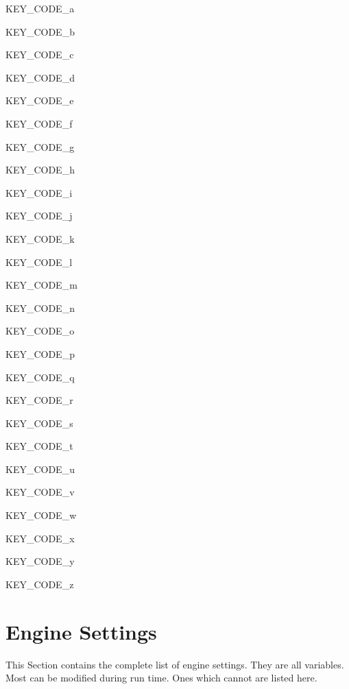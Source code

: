 KEY\_\-CODE\_\-a \par
 KEY\_\-CODE\_\-b \par
 KEY\_\-CODE\_\-c \par
 KEY\_\-CODE\_\-d \par
 KEY\_\-CODE\_\-e \par
 KEY\_\-CODE\_\-f \par
 KEY\_\-CODE\_\-g \par
 KEY\_\-CODE\_\-h \par
 KEY\_\-CODE\_\-i \par
 KEY\_\-CODE\_\-j \par
 KEY\_\-CODE\_\-k \par
 KEY\_\-CODE\_\-l \par
 KEY\_\-CODE\_\-m \par
 KEY\_\-CODE\_\-n \par
 KEY\_\-CODE\_\-o \par
 KEY\_\-CODE\_\-p \par
 KEY\_\-CODE\_\-q \par
 KEY\_\-CODE\_\-r \par
 KEY\_\-CODE\_\-s \par
 KEY\_\-CODE\_\-t \par
 KEY\_\-CODE\_\-u \par
 KEY\_\-CODE\_\-v \par
 KEY\_\-CODE\_\-w \par
 KEY\_\-CODE\_\-x \par
 KEY\_\-CODE\_\-y \par
 KEY\_\-CODE\_\-z \par
\hypertarget{_reference_lists_EngineSettingsPage}{}\section{Engine Settings}\label{_reference_lists_EngineSettingsPage}
This Section contains the complete list of engine settings. They are all variables. Most can be modified during run time. Ones which cannot are listed here.
